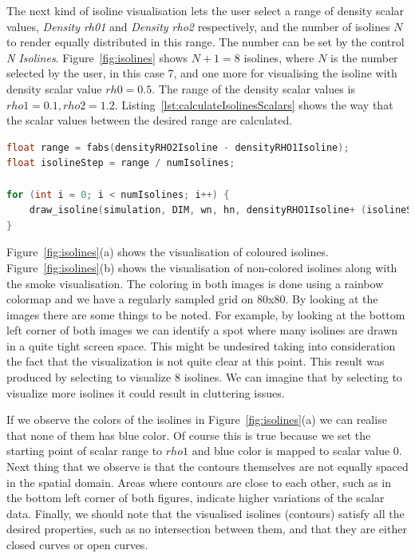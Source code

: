 The next kind of isoline visualisation lets the user select a range of density scalar values, \emph{Density rh01} and \emph{Density rho2} respectively, and the number of isolines $N$ to render equally distributed in this range. The number can be set by the control \emph{N Isolines}. Figure~\ref{fig:isolines} shows $N + 1 = 8$ isolines, where $N$ is the number selected by the user, in this case 7, and one more for visualising the isoline with density scalar value $rh0 = 0.5$. The range of the density scalar values is $rho1 = 0.1, rho2 = 1.2$. Listing~\ref{lst:calculateIsolinesScalars} shows the way that the scalar values between the desired range are calculated.

\begin{lstlisting}[language=C++,label=lst:calculateIsolinesScalars,caption={Calculate scalar between range values and draw isolines.}]
float range = fabs(densityRHO2Isoline - densityRHO1Isoline);
float isolineStep = range / numIsolines;

for (int i = 0; i < numIsolines; i++) {
	draw_isoline(simulation, DIM, wn, hn, densityRHO1Isoline+ (isolineStep * (i + 1)));
}
\end{lstlisting}
 
Figure~\ref{fig:isolines}(a) shows the visualisation of coloured isolines. Figure~\ref{fig:isolines}(b) shows the visualisation of non-colored isolines along with the smoke visualisation. The coloring in both images is done using a rainbow colormap and we have a regularly sampled grid on 80x80. By looking at the images there are some things to be noted. For example, by looking at the bottom left corner of both images we can identify a spot where many isolines are drawn in a quite tight screen space. This might be undesired taking into consideration the fact that the visualization is not quite clear at this point. This result was produced by selecting to visualize 8 isolines. We can imagine that by selecting to visualize more isolines it could result in cluttering issues.

If we observe the colors of the isolines in Figure~\ref{fig:isolines}(a) we can realise that none of them has blue color. Of course this is true because we set the starting point of scalar range to $rho1$ and blue color is mapped to scalar value 0. Next thing that we observe is that the contours themselves are not equally spaced in the spatial domain. Areas where contours are close to each other, such as in the bottom left corner of both figures, indicate higher variations of the scalar data. Finally, we should note that the visualised isolines (contours) satisfy all the desired properties, such as no intersection between them, and that they are either closed curves or open curves.

